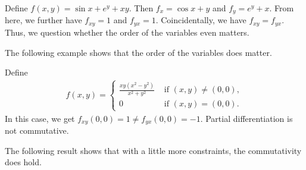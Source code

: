 \begin{example}
    Define $f(x,y) = \sin x + e^{y} + xy$. Then $f_{x} = \cos x + y$ and $f_{y} = e^{y}+x$. From here, we further have $f_{xy} = 1$ and $f_{yx} = 1$. Coincidentally, we have $f_{xy} = f_{yx}$. Thus, we question whether the order of the variables even matters.
\end{example}
The following example shows that the order of the variables does matter.
\begin{example}
    Define
    \begin{align}
        f(x,y) = \begin{cases}
            \frac{xy(x^{2}-y^{2})}{x^{2}+y^{2}} &\text{ if } (x,y) \neq (0,0),\\
            0 &\text{ if } (x,y) = (0,0).
        \end{cases}
    \end{align}
    In this case, we get $f_{xy}(0,0) = 1 \neq f_{yx}(0,0) = -1$. Partial differentiation is not commutative.
\end{example}

The following result shows that with a little more constraints, the commutativity does hold.

